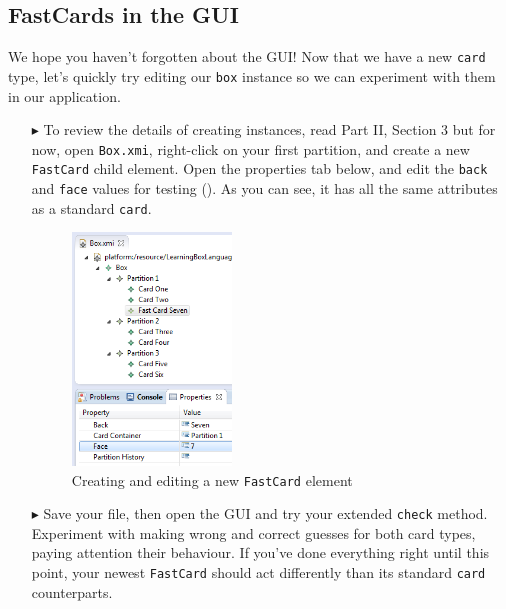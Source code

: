 \newpage
\hypertarget{subsec:fastGUI}{}
\subsection{FastCards in the GUI}
\genHeader

We hope you haven't forgotten about the GUI! Now that we have a new \texttt{card} type, let's quickly try editing our \texttt{box} instance so we can experiment
with them in our application.

\begin{itemize}
  
\item[$\blacktriangleright$] To review the details of creating instances, read Part II, Section 3 but for now, open \texttt{Box.xmi}, right-click on your
first partition, and create a new \texttt{FastCard} child element. Open the properties tab below, and edit the \texttt{back} and \texttt{face} values for
testing (). As you can see, it has all the same attributes as a standard \texttt{card}.

\vspace{0.5cm}

\begin{figure}[htbp]
\begin{center}
  \includegraphics[width=0.4\textwidth]{eclipse_fastCardProperties}
  \caption{Creating and editing a new \texttt{FastCard} element}  
  \label{eclipse:fastCardProperties}
\end{center}
\end{figure}

\item[$\blacktriangleright$] Save your file, then open the GUI and try your extended \texttt{check} method. Experiment with making wrong and correct
guesses for both card types, paying attention their behaviour. If you've done everything right until this point, your newest \texttt{FastCard} should act
differently than its standard \texttt{card} counterparts.

\end{itemize}
